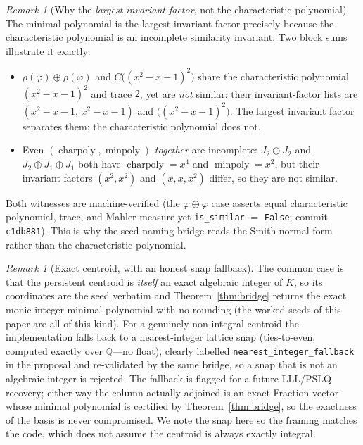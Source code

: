 \documentclass[11pt]{article}
\theoremstyle{plain}
\theoremstyle{definition}
\theoremstyle{remark}
\newtheorem{remark}[theorem]{Remark}
\newcommand{\Q}{\mathbb{Q}}
\newcommand{\K}{K}
\newcommand{\charpoly}{\operatorname{charpoly}}
\newcommand{\minpoly}{\operatorname{minpoly}}
\begin{document}
\begin{remark}[Why the \emph{largest invariant factor}, not the characteristic polynomial]\label{rem:invfac}
The minimal polynomial is the largest invariant factor precisely because the characteristic polynomial is an
incomplete similarity invariant. Two block sums illustrate it exactly:
\begin{itemize}[leftmargin=*]
  \item $\rho(\varphi)\oplus\rho(\varphi)$ and $C\big((x^2-x-1)^2\big)$ share the characteristic polynomial
        $(x^2-x-1)^2$ and trace $2$, yet are \emph{not} similar: their invariant-factor lists are
        $(x^2-x-1,\,x^2-x-1)$ and $\big((x^2-x-1)^2\big)$. The largest invariant factor separates them; the
        characteristic polynomial does not.
  \item Even $(\charpoly,\minpoly)$ \emph{together} are incomplete: $J_2\oplus J_2$ and $J_2\oplus J_1\oplus J_1$
        both have $\charpoly=x^4$ and $\minpoly=x^2$, but their invariant factors $(x^2,x^2)$ and $(x,x,x^2)$
        differ, so they are not similar.
\end{itemize}
Both witnesses are machine-verified (the $\varphi\oplus\varphi$ case asserts equal characteristic polynomial,
trace, and Mahler measure yet \texttt{is\_similar} $=$ \texttt{False}; commit \texttt{c1db881}). This is why
the seed-naming bridge reads the Smith normal form rather than the characteristic polynomial.
\end{remark}

\begin{remark}[Exact centroid, with an honest snap fallback]\label{rem:snap}
The common case is that the persistent centroid is \emph{itself} an exact algebraic integer of $\K$, so its
coordinates are the seed verbatim and Theorem~\ref{thm:bridge} returns the exact monic-integer minimal
polynomial with no rounding (the worked seeds of this paper are all of this kind). For a genuinely
non-integral centroid the implementation falls back to a nearest-integer lattice snap (ties-to-even, computed
exactly over $\Q$---no float), clearly labelled \texttt{nearest\_integer\_fallback} in the proposal and
re-validated by the same bridge, so a snap that is not an algebraic integer is rejected. The fallback is
flagged for a future LLL/PSLQ recovery; either way the column actually adjoined is an exact-Fraction vector
whose minimal polynomial is certified by Theorem~\ref{thm:bridge}, so the exactness of the basis is never
compromised. We note the snap here so the framing matches the code, which does not assume the centroid is
always exactly integral.
\end{remark}
\end{document}

